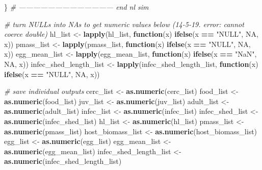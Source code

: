 \documentclass[10,portrait]{article}
\newenvironment{Shaded}{\begin{snugshade}}{\end{snugshade}}
\newcommand{\KeywordTok}[1]{\textcolor[rgb]{0.13,0.29,0.53}{\textbf{#1}}}
\newcommand{\StringTok}[1]{\textcolor[rgb]{0.31,0.60,0.02}{#1}}
\newcommand{\CommentTok}[1]{\textcolor[rgb]{0.56,0.35,0.01}{\textit{#1}}}
\newcommand{\OtherTok}[1]{\textcolor[rgb]{0.56,0.35,0.01}{#1}}
\newcommand{\ControlFlowTok}[1]{\textcolor[rgb]{0.13,0.29,0.53}{\textbf{#1}}}
\newcommand{\OperatorTok}[1]{\textcolor[rgb]{0.81,0.36,0.00}{\textbf{#1}}}
\newcommand{\NormalTok}[1]{#1}
\begin{document}
\begin{Shaded}
\begin{Highlighting}[]
{{{{{{{{{{{{                      
\NormalTok{                    \} }\CommentTok{# --------------------------------------- end nl sim}
                    
                    \CommentTok{# turn NULLs into NAs to get numeric values below (14-5-19. error: cannot coerce double)}
\NormalTok{                    hl_list <-}\StringTok{ }\KeywordTok{lapply}\NormalTok{(hl_list, }\ControlFlowTok{function}\NormalTok{(x) }\KeywordTok{ifelse}\NormalTok{(x }\OperatorTok{==}\StringTok{ "NULL"}\NormalTok{, }\OtherTok{NA}\NormalTok{, x))}
\NormalTok{                    pmass_list <-}\StringTok{ }\KeywordTok{lapply}\NormalTok{(pmass_list, }\ControlFlowTok{function}\NormalTok{(x) }\KeywordTok{ifelse}\NormalTok{(x }\OperatorTok{==}\StringTok{ "NULL"}\NormalTok{, }\OtherTok{NA}\NormalTok{, x))}
\NormalTok{                    egg_mean_list <-}\StringTok{ }\KeywordTok{lapply}\NormalTok{(egg_mean_list, }\ControlFlowTok{function}\NormalTok{(x) }\KeywordTok{ifelse}\NormalTok{(x }\OperatorTok{==}\StringTok{ "NaN"}\NormalTok{, }\OtherTok{NA}\NormalTok{, x))}
\NormalTok{                    infec_shed_length_list <-}\StringTok{ }\KeywordTok{lapply}\NormalTok{(infec_shed_length_list, }\ControlFlowTok{function}\NormalTok{(x) }\KeywordTok{ifelse}\NormalTok{(x }\OperatorTok{==}\StringTok{ "NULL"}\NormalTok{, }\OtherTok{NA}\NormalTok{, x))}
                    
                    \CommentTok{# save individual outputs }
\NormalTok{                    cerc_list <-}\StringTok{ }\KeywordTok{as.numeric}\NormalTok{(cerc_list) }
\NormalTok{                    food_list <-}\StringTok{ }\KeywordTok{as.numeric}\NormalTok{(food_list)}
\NormalTok{                    juv_list <-}\StringTok{ }\KeywordTok{as.numeric}\NormalTok{(juv_list)}
\NormalTok{                    adult_list <-}\StringTok{ }\KeywordTok{as.numeric}\NormalTok{(adult_list)}
\NormalTok{                    infec_list <-}\StringTok{ }\KeywordTok{as.numeric}\NormalTok{(infec_list)}
\NormalTok{                    infec_shed_list <-}\StringTok{ }\KeywordTok{as.numeric}\NormalTok{(infec_shed_list)}
\NormalTok{                    hl_list <-}\StringTok{ }\KeywordTok{as.numeric}\NormalTok{(hl_list)}
\NormalTok{                    pmass_list <-}\StringTok{ }\KeywordTok{as.numeric}\NormalTok{(pmass_list)}
\NormalTok{                    host_biomass_list <-}\StringTok{ }\KeywordTok{as.numeric}\NormalTok{(host_biomass_list)}
\NormalTok{                    egg_list <-}\StringTok{ }\KeywordTok{as.numeric}\NormalTok{(egg_list)}
\NormalTok{                    egg_mean_list <-}\StringTok{ }\KeywordTok{as.numeric}\NormalTok{(egg_mean_list)}
\NormalTok{                    infec_shed_length_list <-}\StringTok{ }\KeywordTok{as.numeric}\NormalTok{(infec_shed_length_list)}
                    
}}}}}}}}}}}}
\end{Highlighting}
\end{Shaded}
\end{document}
